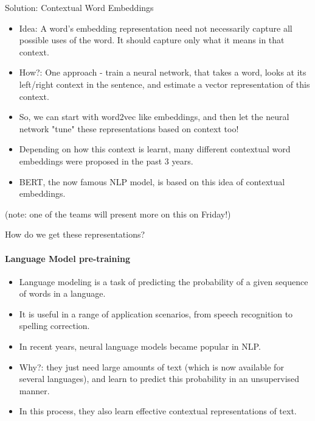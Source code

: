 \documentclass{beamer}
\begin{document}
\begin{frame}{Solution: Contextual Word Embeddings}
\begin{itemize}
    \item Idea: A word's embedding representation need not necessarily capture all possible uses of the word. It should capture only what it means in that context. 
    \item How?: One approach - train a neural network, that takes a word, looks at its left/right context in the sentence, and estimate a vector representation of this context. \pause
    \item So, we can start with word2vec like embeddings, and then let the neural network "tune" these representations based on context too! \pause
    \item Depending on how this context is learnt, many different contextual word embeddings were proposed in the past 3 years. 
    \item BERT, the now famous NLP model, is based on this idea of contextual embeddings. 
\end{itemize}
(note: one of the teams will present more on this on Friday!)
\end{frame}

\begin{frame}{How do we get these representations?}
\framesubtitle{Language Model pre-training}
    \begin{itemize}
    \item Language modeling is a task of predicting the probability of a given sequence of words in a language.
    \item It is useful in a range of application scenarios, from speech recognition to spelling correction. \pause
    \item In recent years, neural language models became popular in NLP.
    \item Why?: \pause they just need large amounts of text (which is now available for several languages), and learn to predict this probability in an unsupervised manner.
    \item In this process, they also learn effective contextual representations of text. 
    \end{itemize}
\end{frame}
\end{document}
